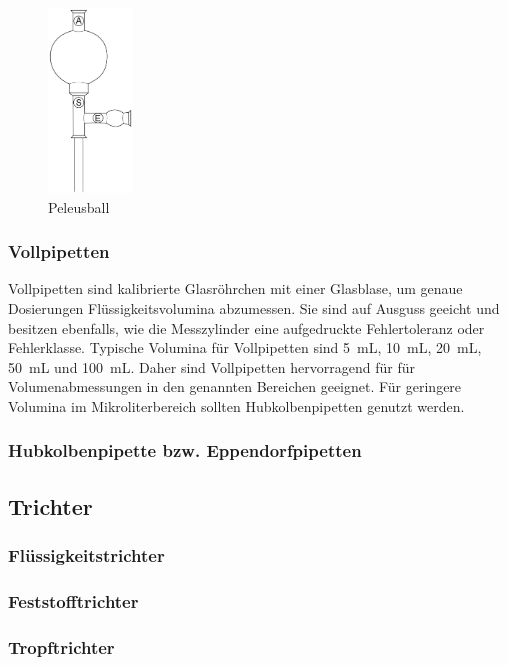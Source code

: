 \begin{figure}[h!]
	\centering
	\includegraphics[width=0.2\textwidth]{img/peleusball}
	\caption{Peleusball}
	\label{fig:peleus}
\end{figure}
\FloatBarrier

\subsubsection{Vollpipetten}
Vollpipetten sind kalibrierte Glasröhrchen mit einer Glasblase, um genaue Dosierungen Flüssigkeitsvolumina abzumessen.  Sie sind auf Ausguss geeicht und besitzen ebenfalls, wie die Messzylinder eine aufgedruckte Fehlertoleranz oder Fehlerklasse. Typische Volumina für Vollpipetten sind \SI{5}{\milli \liter}, \SI{10}{\milli \liter}, \SI{20}{\milli \liter }, \SI{50}{\milli \liter } und \SI{100}{\milli \liter}. Daher sind Vollpipetten hervorragend für für Volumenabmessungen in den genannten Bereichen geeignet. Für geringere Volumina im Mikroliterbereich sollten Hubkolbenpipetten genutzt werden.

\subsubsection{Hubkolbenpipette bzw. Eppendorfpipetten}

\subsection{Trichter}
\subsubsection{Flüssigkeitstrichter}
\subsubsection{Feststofftrichter}
\subsubsection{Tropftrichter}
